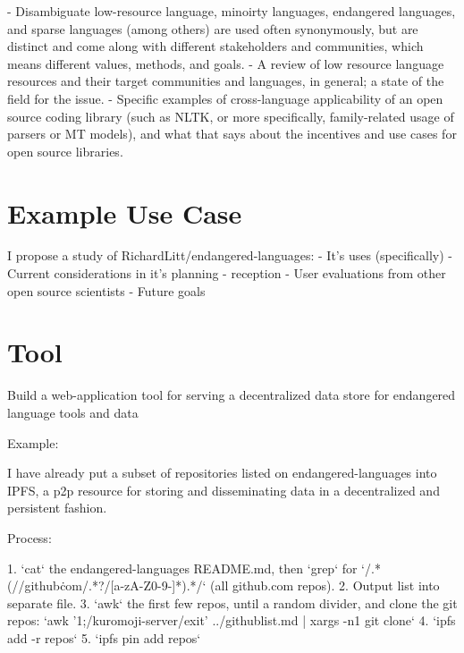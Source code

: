 \documentclass[10pt, a4paper]{article}
\begin{document}
- Disambiguate low-resource language, minoirty languages, endangered languages, and sparse languages (among others) are used often synonymously, but are distinct and come along with different stakeholders and communities, which means different values, methods, and goals.
- A review of low resource language resources and their target communities and languages, in general; a state of the field for the issue.
- Specific examples of cross-language applicability of an open source coding library (such as NLTK, or more specifically, family-related usage of parsers or MT models), and what that says about the incentives and use cases for open source libraries. 

\section{Example Use Case}

I propose a study of RichardLitt/endangered-languages:
- It's uses (specifically)
- Current considerations in it's planning
- reception
  - User evaluations from other open source scientists
- Future goals

\section{Tool}

Build a web-application tool for serving a decentralized data store for endangered language tools and data

Example:

I have already put a subset of repositories listed on endangered-languages into IPFS, a p2p resource for storing and disseminating data in a decentralized and persistent fashion.

Process:

1. `cat` the endangered-languages README.md, then `grep` for `/.*(//github\.com/.*?/[a-zA-Z0-9-]*).*/` (all github.com repos).
2. Output list into separate file.
3. `awk` the first few repos, until a random divider, and clone the git repos: `awk '1;/kuromoji-server/{exit}' ../githublist.md | xargs -n1 git clone`
4. `ipfs add -r repos`
5. `ipfs pin add repos`

%
%
%


\end{document}
